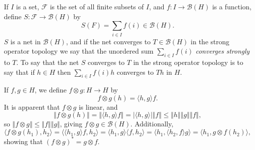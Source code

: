 \documentclass{article}
\newcommand{\inner}[2]{\langle #1, #2 \rangle}
\newcommand{\norm}[1]{\left\Vert #1 \right\Vert}
\begin{document}
If $I$ is a set, $\mathscr{F}$ is the set of all finite subsets of $I$, and $f:I \to \mathscr{B}(H)$ is a function,
define $S:\mathscr{F} \to \mathscr{B}(H)$ by 
\[
S(F) = \sum_{i \in I} f(i) \in \mathscr{B}(H).
\]
$S$ is a net in $\mathscr{B}(H)$, and if the net converges to $T \in \mathscr{B}(H)$ in the strong operator topology we say
that the unordered sum $\sum_{i \in I} f(i)$ {\em converges strongly} to $T$. To say that the net $S$ converges to $T$ in the strong
operator topology is to say that if $h \in H$ then $\sum_{i \in I} f(i)h$ converges to $Th$ in $H$.

If $f,g \in H$, we define $f \otimes g:H \to H$ by 
\[
f \otimes g (h) = \inner{h}{g}f.
\]
It is apparent that $f \otimes g$ is linear, and
\[
\norm{f \otimes g (h)} = \norm{\inner{h}{g}f} = |\inner{h}{g}| \norm{f} \leq \norm{h} \norm{g} \norm{f},
\]
so $\norm{f \otimes g} \leq \norm{f} \norm{g}$, giving $f \otimes g \in \mathscr{B}(H)$. Additionally,
\[
\inner{f \otimes g (h_1)}{h_2} = \inner{\inner{h_1}{g}f}{h_2} = \inner{h_1}{g} \inner{f}{h_2} =\inner{h_1}{\inner{h_2}{f}g} 
=\inner{h_1}{g \otimes f (h_2)},
\]
showing that $(f \otimes g)^* = g \otimes f$.
\end{document}
